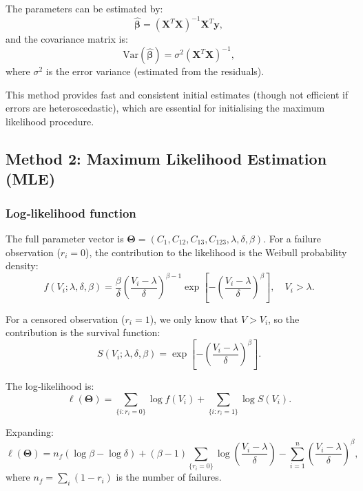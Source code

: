 The parameters can be estimated by:
\begin{equation}
\hat{\boldsymbol{\beta}} = (\mathbf{X}^T\mathbf{X})^{-1}\mathbf{X}^T\mathbf{y},
\label{eq:olsestimator}
\end{equation}
and the covariance matrix is:
\begin{equation}
\text{Var}(\hat{\boldsymbol{\beta}}) = \sigma^2(\mathbf{X}^T\mathbf{X})^{-1},
\label{eq:varianceestimator}
\end{equation}
where \(\sigma^2\) is the error variance (estimated from the residuals).

This method provides fast and consistent initial estimates (though not efficient if errors are heteroscedastic), which are essential for initialising the maximum likelihood procedure.

\subsection{Method 2: Maximum Likelihood Estimation (MLE)}
\label{sec:method-mle}

\subsubsection*{Log‑likelihood function}

The full parameter vector is \(\boldsymbol{\Theta} = (C_1, C_{12}, C_{13}, C_{123}, \lambda, \delta, \beta)\). For a failure observation (\(r_i=0\)), the contribution to the likelihood is the Weibull probability density:
\[
f(V_i;\lambda,\delta,\beta) = \frac{\beta}{\delta}\left(\frac{V_i-\lambda}{\delta}\right)^{\beta-1}\exp\left[-\left(\frac{V_i-\lambda}{\delta}\right)^{\beta}\right],\quad V_i > \lambda.
\]

For a censored observation (\(r_i=1\)), we only know that \(V > V_i\), so the contribution is the survival function:
\[
S(V_i;\lambda,\delta,\beta) = \exp\left[-\left(\frac{V_i-\lambda}{\delta}\right)^{\beta}\right].
\]

The log‑likelihood is:
\begin{equation}\label{eq:loglik}
\ell(\boldsymbol{\Theta}) = \sum_{\{i: r_i=0\}} \log f(V_i) + \sum_{\{i: r_i=1\}} \log S(V_i).
\end{equation}

Expanding:
\begin{equation}\label{eq:loglik_expanded}
\ell(\boldsymbol{\Theta}) = n_f(\log\beta - \log\delta) + (\beta-1)\sum_{\{r_i=0\}}\log\left(\frac{V_i-\lambda}{\delta}\right) - \sum_{i=1}^{n}\left(\frac{V_i-\lambda}{\delta}\right)^{\beta},
\end{equation}
where \(n_f = \sum_i (1 - r_i)\) is the number of failures.

